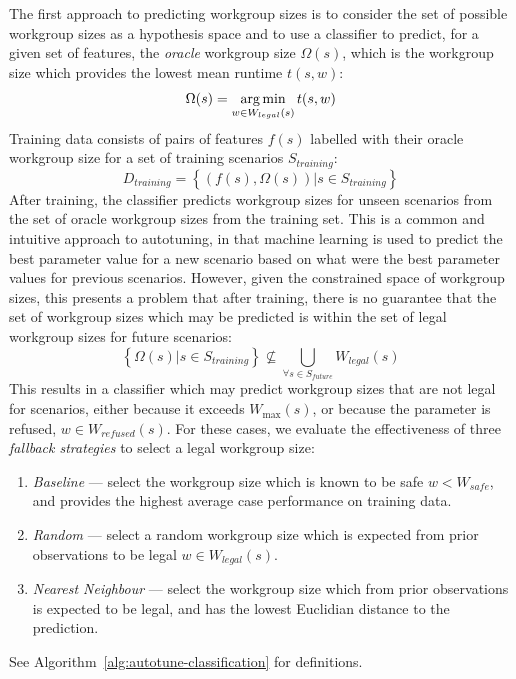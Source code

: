 \documentclass[nonatbib,preprint,10pt]{sigplanconf}
\begin{document}
The first approach to predicting workgroup sizes is to consider the
set of possible workgroup sizes as a hypothesis space and to use a
classifier to predict, for a given set of features, the \emph{oracle}
workgroup size $\Omega(s)$, which is the workgroup size which provides
the lowest mean runtime $t(s,w)$:
%
\begin{equation}
  \Omega(s) = \operatorname*{arg\,min}_{w \in W_{legal}(s)} t(s,w)
\end{equation}
%
Training data consists of pairs of features $f(s)$ labelled with their
oracle workgroup size for a set of training scenarios $S_{training}$:
%
\begin{equation}
  D_{training} = \left\{ \left(f(s), \Omega(s)\right) | s \in S_{training} \right\}
\end{equation}
%
After training, the classifier predicts workgroup sizes for unseen
scenarios from the set of oracle workgroup sizes from the training
set. This is a common and intuitive approach to autotuning, in that
machine learning is used to predict the best parameter value for a new
scenario based on what were the best parameter values for previous
scenarios. However, given the constrained space of workgroup sizes,
this presents a problem that after training, there is no guarantee
that the set of workgroup sizes which may be predicted is within the
set of legal workgroup sizes for future scenarios:
%
\begin{equation}
  \left\{ \Omega(s) | s \in S_{training} \right\} \nsubseteq \bigcup_{\forall s \in S_{future}} W_{legal}(s)
\end{equation}
%
This results in a classifier which may predict workgroup sizes that
are not legal for scenarios, either because it exceeds $W_{\max}(s)$,
or because the parameter is refused, $w \in W_{refused}(s)$. For these
cases, we evaluate the effectiveness of three \emph{fallback
  strategies} to select a legal workgroup size:
%
\begin{enumerate}
\item \emph{Baseline} --- select the workgroup size which is known to
  be safe $w < W_{safe}$, and provides the highest average case
  performance on training data.
\item \emph{Random} --- select a random workgroup size which is
  expected from prior observations to be legal $w \in W_{legal}(s)$.
\item \emph{Nearest Neighbour} --- select the workgroup size which
  from prior observations is expected to be legal, and has the lowest
  Euclidian distance to the prediction.
\end{enumerate}
%
See Algorithm~\ref{alg:autotune-classification} for definitions.
\end{document}
